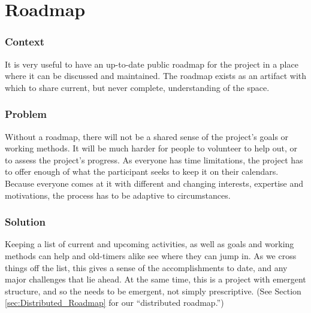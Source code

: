 \begingroup
\color{BurntOrange}

\section{Roadmap} \label{sec:Roadmap}

\subsubsection*{Context} It is very useful to have an up-to-date public roadmap for the project in a place where it can be discussed and maintained. The roadmap exists as an artifact with which to share current, but never complete, understanding of the space.

\subsubsection*{Problem} Without a roadmap, there will not be a shared sense of the project's goals or working methods. It will be much harder for people to volunteer to help out, or to assess the project's progress.  As everyone has time limitations, the project has to offer enough of what the participant seeks to keep it on their calendars.  Because everyone comes at it with different and changing interests, expertise  and motivations, the process has to be adaptive to circumstances.

\subsubsection*{Solution} Keeping a list of current and upcoming activities, as well as goals and working methods can help  and old-timers alike see where they can jump in. As we cross things off the list, this gives a sense of the accomplishments to date, and any major challenges that lie ahead.  At the same time, this is a project with emergent structure, and so the  needs to be emergent, not simply prescriptive.  (See Section \ref{sec:Distributed_Roadmap} for our ``distributed roadmap.'')

